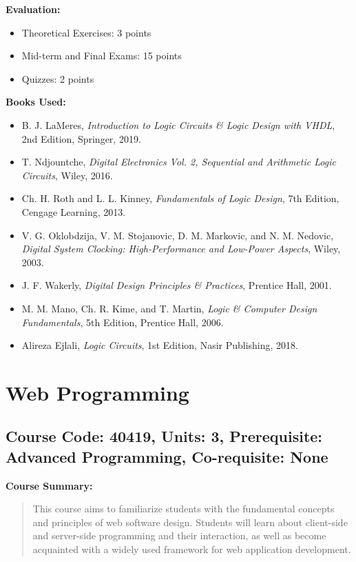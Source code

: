 \documentclass[12pt]{article}
\begin{document}
\textbf{Evaluation:}
\begin{itemize}
    \item Theoretical Exercises: 3 points
    \item Mid-term and Final Exams: 15 points
    \item Quizzes: 2 points
\end{itemize}

\textbf{Books Used:}
\begin{itemize}
    \item B. J. LaMeres, \textit{Introduction to Logic Circuits \& Logic Design with VHDL}, 2nd Edition, Springer, 2019.
    \item T. Ndjountche, \textit{Digital Electronics Vol. 2, Sequential and Arithmetic Logic Circuits}, Wiley, 2016.
    \item Ch. H. Roth and L. L. Kinney, \textit{Fundamentals of Logic Design}, 7th Edition, Cengage Learning, 2013.
    \item V. G. Oklobdzija, V. M. Stojanovic, D. M. Markovic, and N. M. Nedovic, \textit{Digital System Clocking: High-Performance and Low-Power Aspects}, Wiley, 2003.
    \item J. F. Wakerly, \textit{Digital Design Principles \& Practices}, Prentice Hall, 2001.
    \item M. M. Mano, Ch. R. Kime, and T. Martin, \textit{Logic \& Computer Design Fundamentals}, 5th Edition, Prentice Hall, 2006.
    \item Alireza Ejlali, \textit{Logic Circuits}, 1st Edition, Nasir Publishing, 2018.
\end{itemize}

\newpage

\section{Web Programming}
\subsection*{Course Code: 40419, Units: 3, Prerequisite: Advanced Programming, Co-requisite: None}

\textbf{Course Summary:} 
\begin{quote}
   This course aims to familiarize students with the fundamental concepts and principles of web software design. Students will learn about client-side and server-side programming and their interaction, as well as become acquainted with a widely used framework for web application development.
\end{quote}
\end{document}
